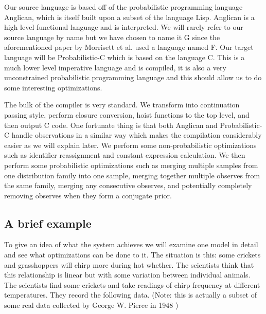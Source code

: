 \documentclass[a4paper]{article}
\begin{document}
Our source language is based off of the probabilistic programming language Anglican, which is itself built upon a subset of the language Lisp. Anglican is a high level functional language and is interpreted. We will rarely refer to our source language by name but we have chosen to name it G since the aforementioned paper by Morrisett et al. used a language named F. Our target language will be Probabilistic-C which is based on the language C. This is a much lower level imperative language and is compiled, it is also a very unconstrained probabilistic programming language and this should allow us to do some interesting optimizations.

The bulk of the compiler is very standard. We transform into continuation passing style, perform closure conversion, hoist functions to the top level, and then output C code. One fortunate thing is that both Anglican and Probabilistic-C handle observations in a similar way which makes the compilation considerably easier as we will explain later. We perform some non-probabilistic optimizations such as identifier reassignment and constant expression calculation. We then perform some probabilistic optimizations such as merging multiple samples from one distribution family into one sample, merging together multiple observes from the same family, merging any consecutive observes, and potentially completely removing observes when they form a conjugate prior.




\subsection{A brief example}

To give an idea of what the system achieves we will examine one model in detail and see what optimizations can be done to it. The situation is this: some crickets and grasshoppers will chirp more during hot whether. The scientists think that this relationship is linear but with some variation between individual animals. The scientists find some crickets and take readings of chirp frequency at different temperatures. They record the following data. (Note: this is actually a subset of some real data collected by George W. Pierce in 1948 \cite{Crickets})
\end{document}
